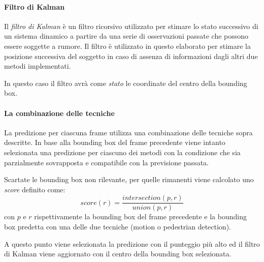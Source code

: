 \paragraph{Filtro di Kalman}

Il \emph{filtro di Kalman} è un filtro ricorsivo utilizzato per stimare lo stato successivo di un sistema dinamico a partire da una serie di osservazioni passate che possono essere soggette a rumore. Il filtro è utilizzato in questo elaborato per stimare la posizione successiva del soggetto in caso di assenza di informazioni dagli altri due metodi implementati.

In questo caso il filtro avrà come \emph{stato} le coordinate del centro della bounding box.

\paragraph{La combinazione delle tecniche}

La predizione per ciascuna frame utilizza una combinazione delle tecniche sopra descritte. In base alla bounding box del frame precedente viene intanto selezionata una predizione per ciascuno dei metodi con la condizione che sia parzialmente sovrapposta e compatibile con la previsione passata.

Scartate le bounding box non rilevante, per quelle rimanenti viene calcolato uno \emph{score} definito come:
\begin{equation}
score(r) = \frac{intersection(p, r)}{union(p, r)}
\end{equation}
con $p$ e $r$ rispettivamente la bounding box del frame precedente e la bounding box predetta con una delle due tecniche (motion o pedestrian detection).

A questo punto viene selezionata la predizione con il punteggio più alto ed il filtro di Kalman viene aggiornato con il centro della bounding box selezionata. 

